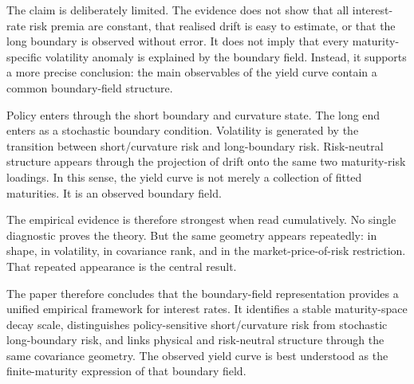 \documentclass[11pt]{article}
\begin{document}
The claim is deliberately limited. The evidence does not show that all interest-rate risk premia are constant, that realised drift is easy to estimate, or that the long boundary is observed without error. It does not imply that every maturity-specific volatility anomaly is explained by the boundary field. Instead, it supports a more precise conclusion: the main observables of the yield curve contain a common boundary-field structure.

Policy enters through the short boundary and curvature state. The long end enters as a stochastic boundary condition. Volatility is generated by the transition between short/curvature risk and long-boundary risk. Risk-neutral structure appears through the projection of drift onto the same two maturity-risk loadings. In this sense, the yield curve is not merely a collection of fitted maturities. It is an observed boundary field.

The empirical evidence is therefore strongest when read cumulatively. No single diagnostic proves the theory. But the same geometry appears repeatedly: in shape, in volatility, in covariance rank, and in the market-price-of-risk restriction. That repeated appearance is the central result.

The paper therefore concludes that the boundary-field representation provides a unified empirical framework for interest rates. It identifies a stable maturity-space decay scale, distinguishes policy-sensitive short/curvature risk from stochastic long-boundary risk, and links physical and risk-neutral structure through the same covariance geometry. The observed yield curve is best understood as the finite-maturity expression of that boundary field.
\end{document}

